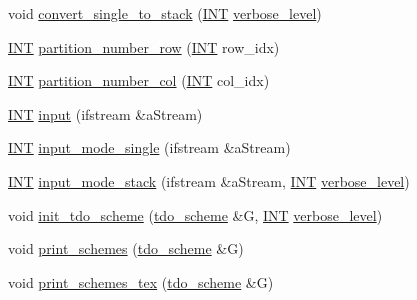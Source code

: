 \begin{DoxyCompactItemize}
\item 
void \mbox{\hyperlink{classgeo__parameter_a38a7db47929dd2be6c51bf84ce6910d1}{convert\+\_\+single\+\_\+to\+\_\+stack}} (\mbox{\hyperlink{galois_8h_a09fddde158a3a20bd2dcadb609de11dc}{I\+NT}} \mbox{\hyperlink{simeon_8_c_a818073fbcc2f439e7c56952f67386122}{verbose\+\_\+level}})
\item 
\mbox{\hyperlink{galois_8h_a09fddde158a3a20bd2dcadb609de11dc}{I\+NT}} \mbox{\hyperlink{classgeo__parameter_a1079d2893d23d9462bc965f7530f2943}{partition\+\_\+number\+\_\+row}} (\mbox{\hyperlink{galois_8h_a09fddde158a3a20bd2dcadb609de11dc}{I\+NT}} row\+\_\+idx)
\item 
\mbox{\hyperlink{galois_8h_a09fddde158a3a20bd2dcadb609de11dc}{I\+NT}} \mbox{\hyperlink{classgeo__parameter_a4db5275b30ad1755f9e3c63e10b5eaa9}{partition\+\_\+number\+\_\+col}} (\mbox{\hyperlink{galois_8h_a09fddde158a3a20bd2dcadb609de11dc}{I\+NT}} col\+\_\+idx)
\item 
\mbox{\hyperlink{galois_8h_a09fddde158a3a20bd2dcadb609de11dc}{I\+NT}} \mbox{\hyperlink{classgeo__parameter_aedd476d7bf192bfe8ce7f311dde15bfe}{input}} (ifstream \&a\+Stream)
\item 
\mbox{\hyperlink{galois_8h_a09fddde158a3a20bd2dcadb609de11dc}{I\+NT}} \mbox{\hyperlink{classgeo__parameter_a235471052aff1633336000b385dfca78}{input\+\_\+mode\+\_\+single}} (ifstream \&a\+Stream)
\item 
\mbox{\hyperlink{galois_8h_a09fddde158a3a20bd2dcadb609de11dc}{I\+NT}} \mbox{\hyperlink{classgeo__parameter_a10ec756948696ab11fafb5091c2d463e}{input\+\_\+mode\+\_\+stack}} (ifstream \&a\+Stream, \mbox{\hyperlink{galois_8h_a09fddde158a3a20bd2dcadb609de11dc}{I\+NT}} \mbox{\hyperlink{simeon_8_c_a818073fbcc2f439e7c56952f67386122}{verbose\+\_\+level}})
\item 
void \mbox{\hyperlink{classgeo__parameter_a054027061960485ce489da47ad285841}{init\+\_\+tdo\+\_\+scheme}} (\mbox{\hyperlink{classtdo__scheme}{tdo\+\_\+scheme}} \&G, \mbox{\hyperlink{galois_8h_a09fddde158a3a20bd2dcadb609de11dc}{I\+NT}} \mbox{\hyperlink{simeon_8_c_a818073fbcc2f439e7c56952f67386122}{verbose\+\_\+level}})
\item 
void \mbox{\hyperlink{classgeo__parameter_afb753a80fc1a6ea2cd24ac6a4158f8c4}{print\+\_\+schemes}} (\mbox{\hyperlink{classtdo__scheme}{tdo\+\_\+scheme}} \&G)
\item 
void \mbox{\hyperlink{classgeo__parameter_a47c2846a970ff964bf11a54d4cde863b}{print\+\_\+schemes\+\_\+tex}} (\mbox{\hyperlink{classtdo__scheme}{tdo\+\_\+scheme}} \&G)
\item 

\end{DoxyCompactItemize}
